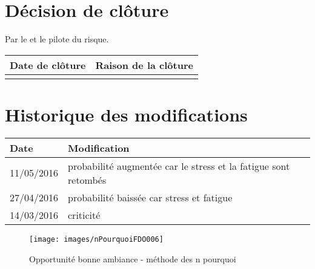 \section*{Décision de clôture}
Par le \CP{} et le pilote du risque.
\begin{table}[h]
\centering
	\begin{tabularx}{16.8cm}{|X|X|}
	\hline
	\rowcolor{gray!40} Date de clôture & Raison de la clôture \\
	\hline
	  & \\
	\hline
	\end{tabularx}
\end{table}

\section*{Historique des modifications}
\begin{table}[h]
\centering
	\begin{tabularx}{16.8cm}{|X|X|}
	\hline
	\rowcolor{gray!40} Date & Modification \\%
	\hline
	11/05/2016  & probabilité augmentée car le stress et la fatigue sont retombés \\
	\hline
	27/04/2016  & probabilité baissée car stress et fatigue \\
	\hline
	14/03/2016  & criticité \\
	\hline
	\end{tabularx}
\end{table}
\newpage


\begin{figure}
	\centering
	\texttt{[image: images/nPourquoiFDO006]}
	\caption{\label{opportunite bonne ambiance}Opportunité bonne ambiance - méthode des n pourquoi}
\end{figure}